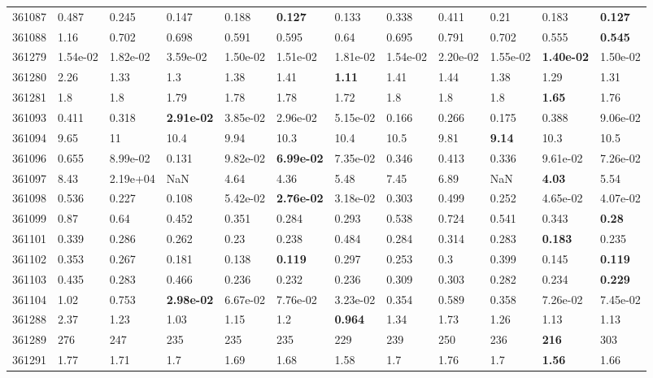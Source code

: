 \begin{table}[ht!]
\begin{tabular}{llllllllllll}
  361087 & 0.487 & 0.245 & 0.147 & 0.188 & \textbf{0.127} & 0.133 & 0.338 & 0.411 & 0.21 & 0.183 & \textbf{0.127} \\ 
  361088 & 1.16 & 0.702 & 0.698 & 0.591 & 0.595 & 0.64 & 0.695 & 0.791 & 0.702 & 0.555 & \textbf{0.545} \\ 
  361279 & 1.54e-02 & 1.82e-02 & 3.59e-02 & 1.50e-02 & 1.51e-02 & 1.81e-02 & 1.54e-02 & 2.20e-02 & 1.55e-02 & \textbf{1.40e-02} & 1.50e-02 \\ 
  361280 & 2.26 & 1.33 & 1.3 & 1.38 & 1.41 & \textbf{1.11} & 1.41 & 1.44 & 1.38 & 1.29 & 1.31 \\ 
  361281 & 1.8 & 1.8 & 1.79 & 1.78 & 1.78 & 1.72 & 1.8 & 1.8 & 1.8 & \textbf{1.65} & 1.76 \\ 
  361093 & 0.411 & 0.318 & \textbf{2.91e-02} & 3.85e-02 & 2.96e-02 & 5.15e-02 & 0.166 & 0.266 & 0.175 & 0.388 & 9.06e-02 \\ 
  361094 & 9.65 & 11 & 10.4 & 9.94 & 10.3 & 10.4 & 10.5 & 9.81 & \textbf{9.14} & 10.3 & 10.5 \\ 
  361096 & 0.655 & 8.99e-02 & 0.131 & 9.82e-02 & \textbf{6.99e-02} & 7.35e-02 & 0.346 & 0.413 & 0.336 & 9.61e-02 & 7.26e-02 \\ 
  361097 & 8.43 & 2.19e+04 & NaN & 4.64 & 4.36 & 5.48 & 7.45 & 6.89 & NaN & \textbf{4.03} & 5.54 \\ 
  361098 & 0.536 & 0.227 & 0.108 & 5.42e-02 & \textbf{2.76e-02} & 3.18e-02 & 0.303 & 0.499 & 0.252 & 4.65e-02 & 4.07e-02 \\ 
  361099 & 0.87 & 0.64 & 0.452 & 0.351 & 0.284 & 0.293 & 0.538 & 0.724 & 0.541 & 0.343 & \textbf{0.28} \\ 
  361101 & 0.339 & 0.286 & 0.262 & 0.23 & 0.238 & 0.484 & 0.284 & 0.314 & 0.283 & \textbf{0.183} & 0.235 \\ 
  361102 & 0.353 & 0.267 & 0.181 & 0.138 & \textbf{0.119} & 0.297 & 0.253 & 0.3 & 0.399 & 0.145 & \textbf{0.119} \\ 
  361103 & 0.435 & 0.283 & 0.466 & 0.236 & 0.232 & 0.236 & 0.309 & 0.303 & 0.282 & 0.234 & \textbf{0.229} \\ 
  361104 & 1.02 & 0.753 & \textbf{2.98e-02} & 6.67e-02 & 7.76e-02 & 3.23e-02 & 0.354 & 0.589 & 0.358 & 7.26e-02 & 7.45e-02 \\ 
  361288 & 2.37 & 1.23 & 1.03 & 1.15 & 1.2 & \textbf{0.964} & 1.34 & 1.73 & 1.26 & 1.13 & 1.13 \\ 
  361289 & 276 & 247 & 235 & 235 & 235 & 229 & 239 & 250 & 236 & \textbf{216} & 303 \\ 
  361291 & 1.77 & 1.71 & 1.7 & 1.69 & 1.68 & 1.58 & 1.7 & 1.76 & 1.7 & \textbf{1.56} & 1.66 \\ 

\end{tabular}
\end{table}
